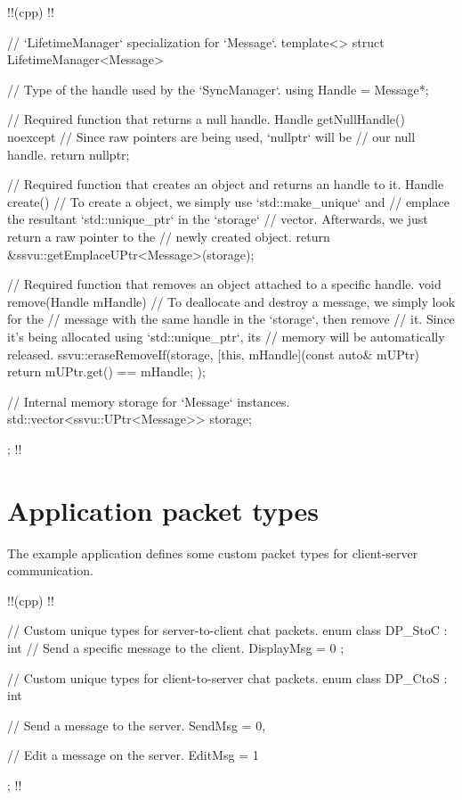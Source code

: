 \documentclass{report}
\begin{document}
!!(cpp)
!!{
    // `LifetimeManager` specialization for `Message`.
    template<> struct LifetimeManager<Message>
    {
        // Type of the handle used by the `SyncManager`.
        using Handle = Message*;

        // Required function that returns a null handle.
        Handle getNullHandle() noexcept 
        { 
            // Since raw pointers are being used, `nullptr` will be
            // our null handle.
            return nullptr; 
        }

        // Required function that creates an object and returns an handle to it.
        Handle create()
        {
            // To create a object, we simply use `std::make_unique` and
            // emplace the resultant `std::unique_ptr` in the `storage`
            // vector. Afterwards, we just return a raw pointer to the
            // newly created object.
            return &ssvu::getEmplaceUPtr<Message>(storage);
        }

        // Required function that removes an object attached to a specific handle.
        void remove(Handle mHandle)
        {
            // To deallocate and destroy a message, we simply look for the
            // message with the same handle in the `storage`, then remove 
            // it. Since it's being allocated using `std::unique_ptr`, its
            // memory will be automatically released.
            ssvu::eraseRemoveIf(storage, [this, mHandle](const auto& mUPtr)
            {
                return mUPtr.get() == mHandle;
            });
        }
        
        // Internal memory storage for `Message` instances.
        std::vector<ssvu::UPtr<Message>> storage;
    };
!!}        

        \section{Application packet types}

            The example application defines some custom packet types for client-server communication.

!!(cpp)
!!{
    // Custom unique types for server-to-client chat packets.
    enum class DP_StoC : int
    {
        // Send a specific message to the client.
        DisplayMsg = 0
    };

    // Custom unique types for client-to-server chat packets.
    enum class DP_CtoS : int
    {
        // Send a message to the server.
        SendMsg = 0,

        // Edit a message on the server.
        EditMsg = 1
    };
!!}        
\end{document}

